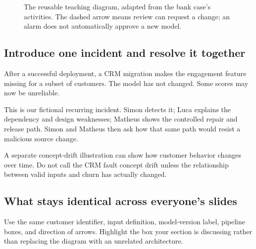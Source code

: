 \documentclass[12pt,a4paper]{article}
\begin{document}
\begin{figure}[htbp]
\centering
{}
\caption{The reusable teaching diagram, adapted from the bank case's activities. The dashed arrow means review can request a change; an alarm does not automatically approve a new model.}
\end{figure}

\subsection{Introduce one incident and resolve it together}
After a successful deployment, a CRM migration makes the engagement feature missing for a subset of customers. The model has not changed. Some scores may now be unreliable.

This is our fictional recurring incident. Simon detects it; Luca explains the dependency and design weaknesses; Matheus shows the controlled repair and release path. Simon and Matheus then ask how that same path would resist a malicious source change.

A separate concept-drift illustration can show how customer behavior changes over time. Do not call the CRM fault concept drift unless the relationship between valid inputs and churn has actually changed.

\subsection{What stays identical across everyone's slides}
Use the same customer identifier, input definition, model-version label, pipeline boxes, and direction of arrows. Highlight the box your section is discussing rather than replacing the diagram with an unrelated architecture.
\end{document}
